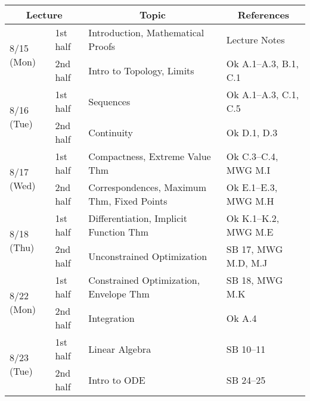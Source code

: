 \documentclass[11pt]{article}
\begin{document}
\begin{tabularx}{\columnwidth}{llll}
  \toprule
  \multicolumn{2}{c}{Lecture}
  &
  \multicolumn{1}{c}{Topic}
  &
  \multicolumn{1}{c}{References}
                                                                                                                 \\\midrule
  \multirow{2}{*}{8/15 (Mon)} & 1st half & Introduction, Mathematical Proofs          & Lecture Notes         \\
                              & 2nd half & Intro to Topology, Limits                  & Ok A.1--A.3, B.1, C.1 \\ [6pt]
  \multirow{2}{*}{8/16 (Tue)} & 1st half & Sequences                                  & Ok A.1--A.3, C.1, C.5 \\
                              & 2nd half & Continuity                                 & Ok D.1, D.3           \\ [6pt]
  \multirow{2}{*}{8/17 (Wed)} & 1st half & Compactness, Extreme Value Thm             & Ok C.3--C.4, MWG M.I  \\ 
                              & 2nd half & Correspondences, Maximum Thm, Fixed Points & Ok E.1--E.3, MWG M.H  \\ [6pt]
  \multirow{2}{*}{8/18 (Thu)} & 1st half & Differentiation, Implicit Function Thm     & Ok K.1--K.2, MWG M.E  \\
                              & 2nd half & Unconstrained Optimization                 & SB 17, MWG M.D, M.J   \\ [6pt]
  \multirow{2}{*}{8/22 (Mon)} & 1st half & Constrained Optimization, Envelope Thm     & SB 18, MWG M.K        \\
                              & 2nd half & Integration                                & Ok A.4                \\ [6pt]
  \multirow{2}{*}{8/23 (Tue)} & 1st half & Linear Algebra                             & SB 10--11             \\
                              & 2nd half & Intro to ODE                               & SB 24--25             \\
  \bottomrule
\end{tabularx}

\end{document}
